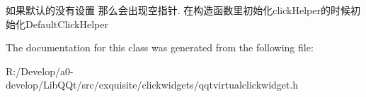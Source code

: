 如果默认的没有设置 那么会出现空指针. 在构造函数里初始化click\+Helper的时候初始化\+Default\+Click\+Helper 

The documentation for this class was generated from the following file\+:\begin{DoxyCompactItemize}
\item 
R\+:/\+Develop/a0-\/develop/\+Lib\+Q\+Qt/src/exquisite/clickwidgets/qqtvirtualclickwidget.\+h\end{DoxyCompactItemize}
